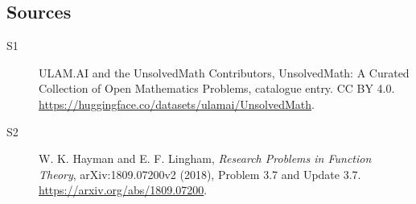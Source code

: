\documentclass[11pt]{article}
\begin{document}
\subsection{Sources}
\begin{description}
\item[\hypertarget{source:statement:1}{S1}] ULAM.AI and the UnsolvedMath Contributors, UnsolvedMath: A Curated Collection of Open Mathematics Problems, catalogue entry. CC BY 4.0. \url{https://huggingface.co/datasets/ulamai/UnsolvedMath}.
\item[\hypertarget{source:statement:2}{S2}] W. K. Hayman and E. F. Lingham, \emph{Research Problems in Function Theory}, arXiv:1809.07200v2 (2018), Problem 3.7 and Update 3.7. \url{https://arxiv.org/abs/1809.07200}.
\end{description}
\label{end:statement}
\end{document}
